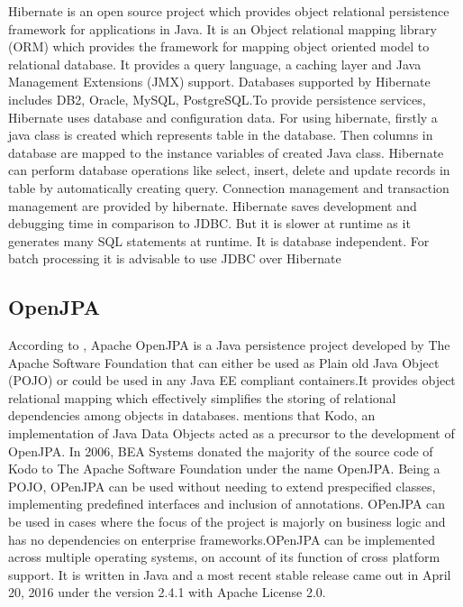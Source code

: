      Hibernate is an open source project which provides object
     relational persistence framework for applications in Java. It is
     an Object relational mapping library (ORM) which provides the
     framework for mapping object oriented model to relational
     database. It provides a query language, a caching layer and Java
     Management Extensions (JMX) support. Databases supported by
     Hibernate includes DB2, Oracle, MySQL, PostgreSQL.To provide
     persistence services, Hibernate uses database and configuration
     data. For using hibernate, firstly a java class is created which
     represents table in the database. Then columns in database are
     mapped to the instance variables of created Java class. Hibernate
     can perform database operations like select, insert, delete and
     update records in table by automatically creating
     query. Connection management and transaction management are
     provided by hibernate.  Hibernate saves development and debugging
     time in comparison to JDBC.  But it is slower at runtime as it
     generates many SQL statements at runtime. It is database
     independent. For batch processing it is advisable to use JDBC
     over Hibernate \cite{www-hibernate}

\subsection{OpenJPA}

     According to \cite{www-openjpa}, Apache OpenJPA is a Java
     persistence project developed by The Apache Software Foundation that
     can either be used as Plain old Java Object (POJO) or could be used in
     any Java EE compliant containers.It provides object relational mapping
     which effectively simplifies the storing of relational dependencies
     among objects in databases. \cite{www-openjpa-wiki} mentions that
     Kodo, an implementation of Java Data Objects acted as a precursor to
     the development of OpenJPA. In 2006, BEA Systems donated the majority
     of the source code of Kodo to The Apache Software Foundation under the
     name OpenJPA. Being a POJO, OPenJPA can be used without needing to
     extend prespecified classes, implementing predefined interfaces and
     inclusion of annotations. OPenJPA can be used in cases where the focus
     of the project is majorly on business logic and has no dependencies on
     enterprise frameworks.OPenJPA can be implemented across multiple
     operating systems, on account of its function of cross platform
     support. It is written in Java and a most recent stable release came
     out in April 20, 2016 under the version 2.4.1 with Apache License 2.0.

